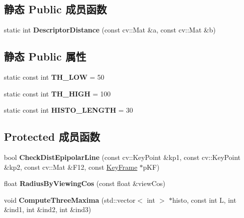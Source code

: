 \subsection*{静态 Public 成员函数}
\begin{DoxyCompactItemize}
\item 
\hypertarget{classORB__SLAM2_1_1ORBmatcher_a63ff10561753f23220c2bfcea9b599f3}{static int {\bfseries Descriptor\-Distance} (const cv\-::\-Mat \&a, const cv\-::\-Mat \&b)}\label{classORB__SLAM2_1_1ORBmatcher_a63ff10561753f23220c2bfcea9b599f3}

\end{DoxyCompactItemize}
\subsection*{静态 Public 属性}
\begin{DoxyCompactItemize}
\item 
\hypertarget{classORB__SLAM2_1_1ORBmatcher_a810252607722e100efe4c4e941ae00a6}{static const int {\bfseries T\-H\-\_\-\-L\-O\-W} = 50}\label{classORB__SLAM2_1_1ORBmatcher_a810252607722e100efe4c4e941ae00a6}

\item 
\hypertarget{classORB__SLAM2_1_1ORBmatcher_aeb28265794388e19763e9a3dabd51473}{static const int {\bfseries T\-H\-\_\-\-H\-I\-G\-H} = 100}\label{classORB__SLAM2_1_1ORBmatcher_aeb28265794388e19763e9a3dabd51473}

\item 
\hypertarget{classORB__SLAM2_1_1ORBmatcher_aa2f2d9094b4f31db4f65c93778f71494}{static const int {\bfseries H\-I\-S\-T\-O\-\_\-\-L\-E\-N\-G\-T\-H} = 30}\label{classORB__SLAM2_1_1ORBmatcher_aa2f2d9094b4f31db4f65c93778f71494}

\end{DoxyCompactItemize}
\subsection*{Protected 成员函数}
\begin{DoxyCompactItemize}
\item 
\hypertarget{classORB__SLAM2_1_1ORBmatcher_a10df000eeb05466a5bbfd7b40c7db45d}{bool {\bfseries Check\-Dist\-Epipolar\-Line} (const cv\-::\-Key\-Point \&kp1, const cv\-::\-Key\-Point \&kp2, const cv\-::\-Mat \&F12, const \hyperlink{classORB__SLAM2_1_1KeyFrame}{Key\-Frame} $\ast$p\-K\-F)}\label{classORB__SLAM2_1_1ORBmatcher_a10df000eeb05466a5bbfd7b40c7db45d}

\item 
\hypertarget{classORB__SLAM2_1_1ORBmatcher_ae6ae0904b9919f1141ef4a790cd34bfe}{float {\bfseries Radius\-By\-Viewing\-Cos} (const float \&view\-Cos)}\label{classORB__SLAM2_1_1ORBmatcher_ae6ae0904b9919f1141ef4a790cd34bfe}

\item 
\hypertarget{classORB__SLAM2_1_1ORBmatcher_ad6613e26706798c507b5266cdd101311}{void {\bfseries Compute\-Three\-Maxima} (std\-::vector$<$ int $>$ $\ast$histo, const int L, int \&ind1, int \&ind2, int \&ind3)}\label{classORB__SLAM2_1_1ORBmatcher_ad6613e26706798c507b5266cdd101311}

\end{DoxyCompactItemize}
